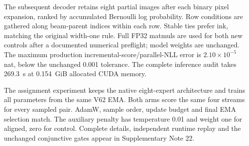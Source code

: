 \documentclass[12pt,a4paper]{article}
\newcommand{\BeamSeconds}{269.3}
\newcommand{\BeamMemory}{0.154}
\begin{document}
The subsequent decoder retains eight partial images after each binary pixel
expansion, ranked by accumulated Bernoulli log probability. Row conditions are
gathered along beam-parent indices within each row. Stable ties prefer ink,
matching the original width-one rule. Full FP32 matmuls are used for both new
controls after a documented numerical preflight; model weights are unchanged.
The maximum production incremental-score/parallel-NLL error is
$2.10\times10^{-5}$ nat, below the unchanged 0.001 tolerance. The complete
inference audit takes \BeamSeconds\ s at \BeamMemory\ GiB allocated CUDA memory.

The assignment experiment keeps the native eight-expert architecture and
trains all parameters from the same V62 EMA. Both arms score the same four
streams for every sampled pair. AdamW, sample order, update budget and final
EMA selection match. The auxiliary penalty has temperature 0.01 and weight
one for aligned, zero for control. Complete details, independent runtime
replay and the unchanged conjunctive gates appear in Supplementary Note 22.
\end{document}
